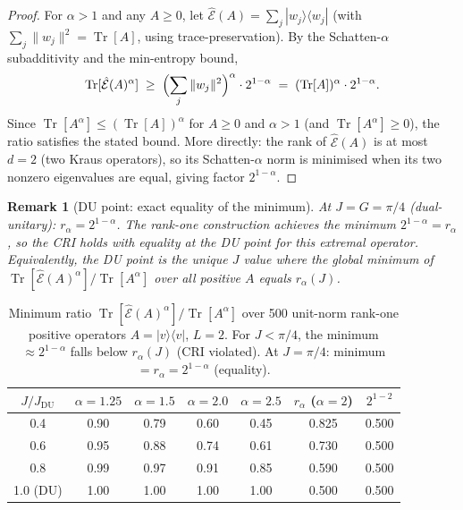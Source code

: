 \documentclass[12pt,a4paper]{article}
\newtheorem{remark}[theorem]{Remark}
\begin{document}
\begin{proof}
For $\alpha>1$ and any $A\geq 0$, let $\hat{\mathcal{E}}(A)=\sum_j|w_j\rangle\langle w_j|$
(with $\sum_j\|w_j\|^2=\operatorname{Tr}[A]$, using trace-preservation).
By the Schatten-$\alpha$ subadditivity and the min-entropy bound,
\[
  \operatorname{Tr}[\hat{\mathcal{E}}(A)^\alpha]
  \;\geq\; \Bigl(\sum_j\|w_j\|^2\Bigr)^\alpha\cdot 2^{1-\alpha}
  \;=\; (\operatorname{Tr}[A])^\alpha\cdot 2^{1-\alpha}.
\]
Since $\operatorname{Tr}[A^\alpha]\leq(\operatorname{Tr}[A])^\alpha$ for $A\geq 0$ and $\alpha>1$
(and $\operatorname{Tr}[A^\alpha]\geq 0$), the ratio satisfies the stated bound.
More directly: the rank of $\hat{\mathcal{E}}(A)$ is at most $d=2$ (two Kraus operators),
so its Schatten-$\alpha$ norm is minimised when its two nonzero eigenvalues are equal,
giving factor $2^{1-\alpha}$.
\end{proof}

\begin{remark}[DU point: exact equality of the minimum]
\label{rem:du_cri_exact}
At $J=G=\pi/4$ (dual-unitary): $r_\alpha=2^{1-\alpha}$.
The rank-one construction achieves the minimum $2^{1-\alpha}=r_\alpha$,
so the CRI holds \emph{with equality} at the DU point for this extremal operator.
Equivalently, the DU point is the unique $J$ value where the global minimum
of $\operatorname{Tr}[\hat{\mathcal{E}}(A)^\alpha]/\operatorname{Tr}[A^\alpha]$
over all positive $A$ equals $r_\alpha(J)$.
\end{remark}

\begin{table}[h!]
\centering
\caption{Minimum ratio $\operatorname{Tr}[\hat{\mathcal{E}}(A)^\alpha]/\operatorname{Tr}[A^\alpha]$
over 500 unit-norm rank-one positive operators $A=|v\rangle\langle v|$, $L=2$.
For $J<\pi/4$, the minimum $\approx 2^{1-\alpha}$ falls below $r_\alpha(J)$
(CRI violated). At $J=\pi/4$: minimum $= r_\alpha = 2^{1-\alpha}$ (equality).}
\label{tab:cri_rank1}
\begin{tabular}{c|cccc|cc}
$J/J_{\mathrm{DU}}$ & $\alpha=1.25$ & $\alpha=1.5$ & $\alpha=2.0$ & $\alpha=2.5$
  & $r_\alpha$ ($\alpha{=}2$) & $2^{1-2}$ \\
\hline
0.4 & 0.90 & 0.79 & 0.60 & 0.45 & 0.825 & 0.500 \\
0.6 & 0.95 & 0.88 & 0.74 & 0.61 & 0.730 & 0.500 \\
0.8 & 0.99 & 0.97 & 0.91 & 0.85 & 0.590 & 0.500 \\
1.0 (DU) & 1.00 & 1.00 & 1.00 & 1.00 & 0.500 & 0.500 \\
\end{tabular}
\end{table}
\end{document}
